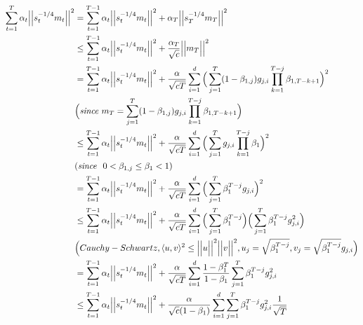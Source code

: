 \documentclass{article}
\begin{document}
\begin{align}
\label{supeq:4}
    \sum_{t=1}^T \alpha_t \Big \vert \Big \vert s_t^{-1/4}m_t \Big \vert \Big \vert^2 &= \sum_{t=1}^{T-1} \alpha_t \Big \vert \Big \vert s_t^{-1/4}m_t \Big \vert \Big \vert^2 + \alpha_T \Big \vert \Big \vert s_T^{-1/4}m_T \Big \vert \Big \vert^2 \nonumber \\
    & \leq \sum_{t=1}^{T-1} \alpha_t \Big \vert \Big \vert s_t^{-1/4}m_t \Big \vert \Big \vert^2 + {\color{black} \frac{\alpha_T}{\sqrt{c}} \Big \vert \Big \vert m_T \Big \vert \Big \vert^2} \nonumber \\
    &= \sum_{t=1}^{T-1} \alpha_t \Big \vert \Big \vert s_t^{-1/4}m_t \Big \vert \Big \vert^2 + \frac{\alpha}{\sqrt{cT}} \sum_{i=1}^d \Big( \sum_{j=1}^T (1-\beta_{1,j}) g_{j,i} \prod_{k=1}^{T-j} \beta_{1, T-k+1}  \Big )^2 \nonumber \\
    &\Big(\textit{since\ } m_T = \sum_{j=1}^T (1-\beta_{1,j}) g_{j,i} \prod_{k=1}^{T-j} \beta_{1, T-k+1} \Big) \nonumber \\
    & \leq  \sum_{t=1}^{T-1} \alpha_t \Big \vert \Big \vert s_t^{-1/4}m_t \Big \vert \Big \vert^2 + {\color{black}\frac{\alpha}{\sqrt{cT}} \sum_{i=1}^d \Big( \sum_{j=1}^T  g_{j,i} \prod_{k=1}^{T-j} \beta_1 \Big)^2} \nonumber \\
    &(\textit{since \ } 0<\beta_{1,j} \leq \beta_1 < 1) \nonumber \\
    & =  \sum_{t=1}^{T-1} \alpha_t \Big \vert \Big \vert s_t^{-1/4}m_t \Big \vert \Big \vert^2 + {\color{black} \frac{\alpha}{\sqrt{cT}} \sum_{i=1}^d \Big( \sum_{j=1}^T \beta_1^{T-j}  g_{j,i} \Big)^2} \nonumber \\ 
    & \leq \sum_{t=1}^{T-1} \alpha_t \Big \vert \Big \vert s_t^{-1/4}m_t \Big \vert \Big \vert^2 + {\color{black} \frac{\alpha}{\sqrt{cT}} \sum_{i=1}^d \Big( \sum_{j=1}^T \beta_1^{T-j} \Big ) \Big( \sum_{j=1}^T \beta_1^{T-j}  g_{j,i}^2 \Big) } \nonumber \\
    & \Big( Cauchy-Schwartz, \langle u,v \rangle^2 \leq \Big \vert \Big \vert u \Big \vert \Big \vert^2 \Big \vert \Big \vert v \Big \vert \Big \vert^2, u_j = \sqrt{\beta_1^{T-j}}, v_j = \sqrt{\beta_1^{T-j}} g_{j,i}\Big) \nonumber \\
    & = \sum_{t=1}^{T-1} \alpha_t \Big \vert \Big \vert s_t^{-1/4}m_t \Big \vert \Big \vert^2 + {\color{black} \frac{\alpha}{\sqrt{cT}} \sum_{i=1}^d \frac{1-\beta_1^T}{1-\beta_1} \sum_{j=1}^T \beta_1^{T-j} g_{j,i}^2} \nonumber \\
    & \leq \sum_{t=1}^{T-1} \alpha_t \Big \vert \Big \vert s_t^{-1/4}m_t \Big \vert \Big \vert^2 + \frac{\alpha}{\sqrt{c}(1-\beta_1)} \sum_{i=1}^d \sum_{j=1}^T \beta_1^{T-j} g_{j,i}^2 \frac{1}{\sqrt{T}} \nonumber \\

\end{align}
\end{document}

